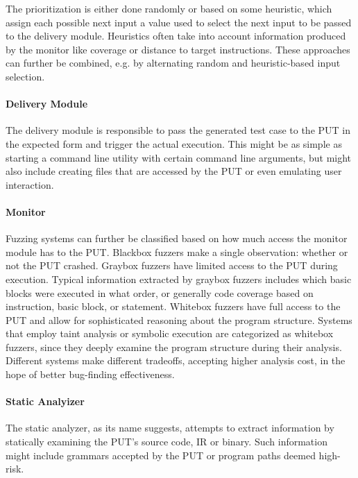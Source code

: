 \documentclass{article}
\begin{document}
\begin{multicols}{2}
    The prioritization is either done randomly or based on some heuristic, which assign each possible next input a value used to select the next input to be passed to the delivery module. Heuristics often take into account information produced by the monitor like coverage or distance to target instructions. These approaches can further be combined, e.g. by alternating random and heuristic-based input selection.

    \paragraph{Delivery Module}
    The delivery module is responsible to pass the generated test case to the PUT in the expected form and trigger the actual execution. This might be as simple as starting a command line utility with certain command line arguments, but might also include creating files that are accessed by the PUT or even emulating user interaction.

    \paragraph{Monitor}
    Fuzzing systems can further be classified based on how much access the monitor module has to the PUT. Blackbox fuzzers make a single observation: whether or not the PUT crashed. Graybox fuzzers have limited access to the PUT during execution. Typical information extracted by graybox fuzzers includes which basic blocks were executed in what order, or generally code coverage based on instruction, basic block, or statement. Whitebox fuzzers have full access to the PUT and allow for sophisticated reasoning about the program structure. Systems that employ taint analysis or symbolic execution are categorized as whitebox fuzzers, since they deeply examine the program structure during their analysis. Different systems make different tradeoffs, accepting higher analysis cost, in the hope of better bug-finding effectiveness.\cite{EvaluatingFuzzTesting}

    \paragraph{Static Analyizer}
    The static analyzer, as its name suggests, attempts to extract information by statically examining the PUT's source code, IR or binary. Such information might include grammars accepted by the PUT or program paths deemed high-risk.


\end{multicols}
\end{document}
